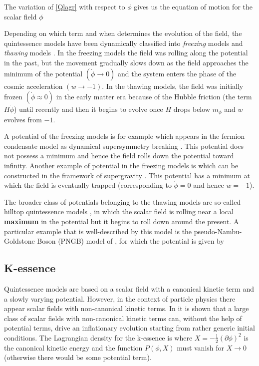 The variation of \eqref{Qlagr} with respect to $\phi$ gives us the equation of motion for the scalar field $\phi$

Depending on which term and when determines the evolution of the field, the quintessence models have been dynamically classified into \textit{freezing} models and \textit{thawing} models \parencite{2005PhRvL..95n1301C}. In the freezing models the field was rolling along the potential in the past, but the movement gradually slows down as the field approaches the minimum of the potential $(\dot{\phi}\rightarrow0)$ and the system enters the phase of the cosmic acceleration $(w\rightarrow-1)$. In the thawing models, the field was initially frozen $(\dot{\phi}\approx0)$ in the early matter era because of the Hubble friction (the term $H\dot{\phi}$) until recently and then it begins to evolve once $H$ drops below $m_\phi$ and $w$ evolves from $-1$.

A potential of the freezing models is for example
which appears in the fermion condensate model as dynamical supersymmetry breaking \parencite{1999PhRvD..60f3502B}. This potential does not possess a minimum and hence the field rolls down the potential toward infinity. Another example of potential in the freezing models is
which can be constructed in the framework of supergravity \parencite{1999PhLB..468...40B}. This potential has a minimum at which the field is eventually trapped (corresponding to $\dot{\phi}=0$ and hence $w=-1$).

The broader class of potentials belonging to the thawing models are so-called hilltop quintessence models \parencite{2008PhRvD..78l3525D}, in which the scalar field is rolling near a local \textbf{maximum} in the potential but it begins to roll down around the present. A particular example that is well-described by this model is the pseudo-Nambu-Goldstone Boson (PNGB) model of \textcite{1995PhRvL..75.2077F}, for which the potential is given by
\subsection{K-essence}
Quintessence models are based on a scalar field with a canonical kinetic term and a slowly varying potential. However, in the context of particle physics there appear scalar fields with non-canonical kinetic terms. In \textcite{1999PhLB..458..209A} it is shown that a large class of scalar fields with non-canonical kinetic terms can, without the help of potential terms, drive an inflationary evolution starting from rather generic initial conditions. The Lagrangian density for the k-essence is
where $X=-\frac12(\partial\phi)^2$ is the canonical kinetic energy and the function $P(\phi, X)$ must vanish for $X\rightarrow0$ (otherwise there would be some potential term). 

